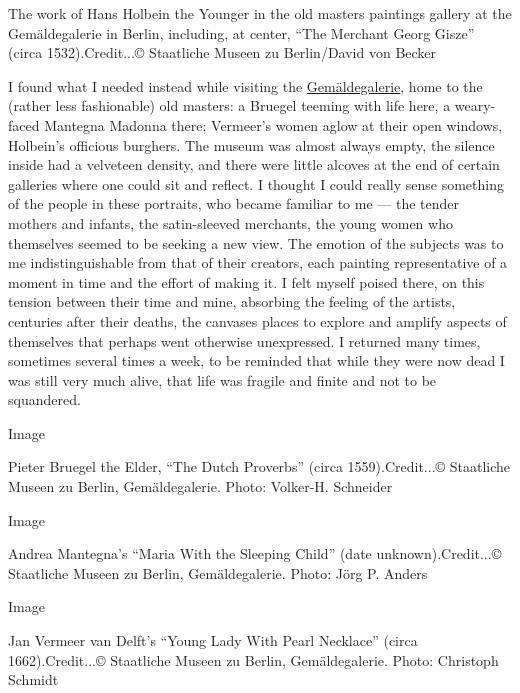 The work of Hans Holbein the Younger in the old masters paintings
gallery at the Gemäldegalerie in Berlin, including, at center, ``The
Merchant Georg Gisze'' (circa 1532).Credit...© Staatliche Museen zu
Berlin/David von Becker

I found what I needed instead while visiting the
\href{https://www.smb.museum/museen-einrichtungen/gemaeldegalerie/home/}{Gemäldegalerie},
home to the (rather less fashionable) old masters: a Bruegel teeming
with life here, a weary-faced Mantegna Madonna there; Vermeer's women
aglow at their open windows, Holbein's officious burghers. The museum
was almost always empty, the silence inside had a velveteen density, and
there were little alcoves at the end of certain galleries where one
could sit and reflect. I thought I could really sense something of the
people in these portraits, who became familiar to me --- the tender
mothers and infants, the satin-sleeved merchants, the young women who
themselves seemed to be seeking a new view. The emotion of the subjects
was to me indistinguishable from that of their creators, each painting
representative of a moment in time and the effort of making it. I felt
myself poised there, on this tension between their time and mine,
absorbing the feeling of the artists, centuries after their deaths, the
canvases places to explore and amplify aspects of themselves that
perhaps went otherwise unexpressed. I returned many times, sometimes
several times a week, to be reminded that while they were now dead I was
still very much alive, that life was fragile and finite and not to be
squandered.

Image

Pieter Bruegel the Elder, ``The Dutch Proverbs'' (circa 1559).Credit...©
Staatliche Museen zu Berlin, Gemäldegalerie. Photo: Volker-H. Schneider

Image

Andrea Mantegna's ``Maria With the Sleeping Child'' (date
unknown).Credit...© Staatliche Museen zu Berlin, Gemäldegalerie. Photo:
Jörg P. Anders

Image

Jan Vermeer van Delft's ``Young Lady With Pearl Necklace'' (circa
1662).Credit...© Staatliche Museen zu Berlin, Gemäldegalerie. Photo:
Christoph Schmidt

